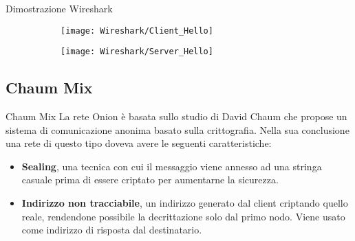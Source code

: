 \begin{frame}{Dimostrazione Wireshark}
    \begin{figure}[htbp]
        \begin{subfigure}[c]{0.5\textwidth}
            \texttt{[image: Wireshark/Client\_Hello]}
        \end{subfigure}
        \begin{subfigure}[c]{0.49\textwidth}
            \texttt{[image: Wireshark/Server\_Hello]}
        \end{subfigure}
    \end{figure}
\end{frame}


\subsection{Chaum Mix}
\begin{frame}{Chaum Mix}
    La rete Onion è basata sullo studio di David Chaum che propose un sistema di comunicazione anonima basato sulla crittografia. Nella sua conclusione una rete di questo tipo doveva avere le seguenti caratteristiche:
    \begin{itemize}
        \item \textbf{Sealing}, una tecnica con cui il messaggio viene annesso ad una stringa casuale prima di essere criptato per aumentarne la sicurezza.
        \item \textbf{Indirizzo non tracciabile}, un indirizzo generato dal client criptando quello reale, rendendone possibile la decrittazione solo dal primo nodo. Viene usato come indirizzo di risposta dal destinatario.
    \end{itemize}
\end{frame}